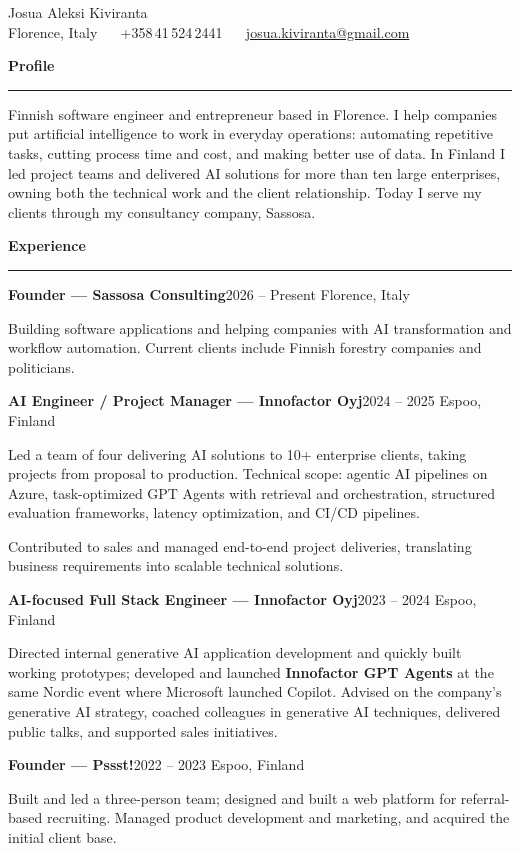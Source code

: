 \documentclass[10pt,a4paper]{article}
\newcommand{\cvsection}[1]{%
  \vspace{9pt}%
  {\textbf{#1}}\par
  \vspace{1.5pt}\hrule\vspace{5pt}}
\newcommand{\entry}[2]{%
  \needspace{3\baselineskip}%
  \vspace{4.5pt}%
  \textbf{#1}\hfill #2\par\nopagebreak\vspace{0.5pt}}
\begin{document}
\begin{center}
  {\LARGE Josua Aleksi Kiviranta}\\[5pt]
  Florence, Italy \ \textperiodcentered{} \ +358\,41\,524\,2441 \ \textperiodcentered{} \ \href{mailto:josua.kiviranta@gmail.com}{josua.kiviranta@gmail.com}
\end{center}

\cvsection{Profile}
Finnish software engineer and entrepreneur based in Florence. I help companies put artificial intelligence to work in everyday operations: automating repetitive tasks, cutting process time and cost, and making better use of data. In Finland I led project teams and delivered AI solutions for more than ten large enterprises, owning both the technical work and the client relationship. Today I serve my clients through my consultancy company, Sassosa.

\cvsection{Experience}

\entry{Founder --- Sassosa Consulting}{2026 -- Present \textperiodcentered{} Florence, Italy}
Building software applications and helping companies with AI transformation and workflow automation. Current clients include Finnish forestry companies and politicians.

\entry{AI Engineer / Project Manager --- Innofactor Oyj}{2024 -- 2025 \textperiodcentered{} Espoo, Finland}
Led a team of four delivering AI solutions to 10+ enterprise clients, taking projects from proposal to production. Technical scope: agentic AI pipelines on Azure, task-optimized GPT Agents with retrieval and orchestration, structured evaluation frameworks, latency optimization, and CI/CD pipelines.

Contributed to sales and managed end-to-end project deliveries, translating business requirements into scalable technical solutions.

\entry{AI-focused Full Stack Engineer --- Innofactor Oyj}{2023 -- 2024 \textperiodcentered{} Espoo, Finland}
Directed internal generative AI application development and quickly built working prototypes; developed and launched \textbf{Innofactor GPT Agents} at the same Nordic event where Microsoft launched Copilot. Advised on the company's generative AI strategy, coached colleagues in generative AI techniques, delivered public talks, and supported sales initiatives.

\entry{Founder --- Pssst!}{2022 -- 2023 \textperiodcentered{} Espoo, Finland}
Built and led a three-person team; designed and built a web platform for referral-based recruiting. Managed product development and marketing, and acquired the initial client base.
\end{document}
